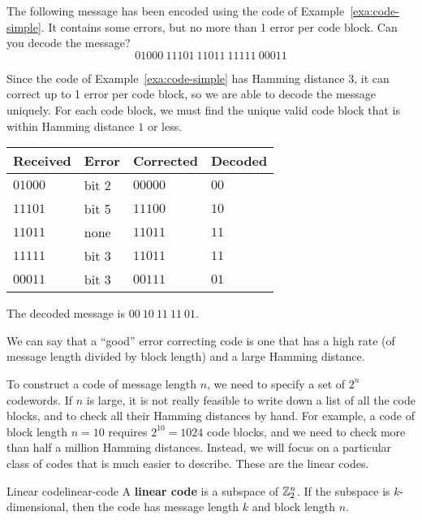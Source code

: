 \begin{example}
  The following message has been encoded using the code of
  Example~\ref{exa:code-simple}. It contains some errors, but no more
  than 1 error per code block. Can you decode the message?
  \begin{equation*}
    01000~11101~11011~11111~00011
  \end{equation*}
\end{example}

\begin{solution}
  Since the code of Example~\ref{exa:code-simple} has Hamming distance
  $3$, it can correct up to 1 error per code block, so we are able to
  decode the message uniquely. For each code block, we must find the
  unique valid code block that is within Hamming distance $1$ or less.
  \begin{center}
    \begin{tabular}{|l|l|l|l|}
      \hline
      Received & Error & Corrected & Decoded \\\hline
      $01000$  & bit 2 & $00000$   & $00$    \\
      $11101$  & bit 5 & $11100$   & $10$    \\
      $11011$  & none  & $11011$   & $11$    \\
      $11111$  & bit 3 & $11011$   & $11$    \\
      $00011$  & bit 3 & $00111$   & $01$    \\
      \hline
    \end{tabular}
  \end{center}
  The decoded message is $00~10~11~11~01$.
\end{solution}

We can say that a ``good'' error correcting code is one that has a
high rate (of message length divided by block length) and a large
Hamming distance.

To construct a code of message length $n$, we need to specify a set of
$2^n$ codewords. If $n$ is large, it is not really feasible to write
down a list of all the code blocks, and to check all their Hamming
distances by hand. For example, a code of block length $n=10$ requires
$2^{10}=1024$ code blocks, and we need to check more than half a
million Hamming distances. Instead, we will focus on a particular
class of codes that is much easier to describe. These are the linear
codes.

\begin{definition}{Linear code}{linear-code}
  A \textbf{linear code} is a subspace of $\mathbb{Z}_2^n$. If the subspace is
  $k$-dimensional, then the code has message length $k$ and block
  length $n$.
\end{definition}


